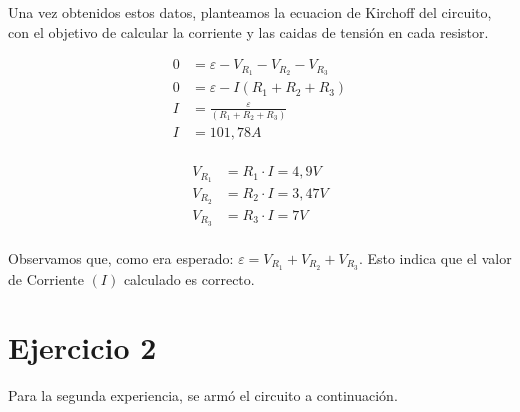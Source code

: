 \documentclass[12pt]{report}
\begin{document}
Una vez obtenidos estos datos, planteamos la ecuacion de Kirchoff del circuito,
con el objetivo de calcular la corriente y las caidas de tensión en cada resistor.

\begin{minipage}[t]{0.48\textwidth}
  $$
  \begin{aligned}
    0 &= \varepsilon - V_{R_1} - V_{R_2} - V_{R_3}\\[6pt]
    0 &= \varepsilon - I (R_1 + R_2 + R_3)\\[6pt]
    I &= \frac{\varepsilon}{(R_1 + R_2 + R_3)}\\[6pt]
    I &= 101,78A\\[6pt]
  \end{aligned}
  $$
\end{minipage}
\hfill
\begin{minipage}[t]{0.48\textwidth}
  \vspace{7mm}
  $$
  \begin{aligned}
    V_{R_1} &= R_1 \cdot I = 4,9 V\\[6pt]
    V_{R_2} &= R_2 \cdot I = 3,47 V\\[6pt]
    V_{R_3} &= R_3 \cdot I = 7 V\\[6pt]
  \end{aligned}
  $$
\end{minipage}

Observamos que, como era esperado: $\varepsilon =  V_{R_1} + V_{R_2} + V_{R_3}$. Esto 
indica que el valor de Corriente $(I)$ calculado es correcto.

%
%
%
%

\chapter{Ejercicio 2}
Para la segunda experiencia, se armó el circuito a continuación.
\end{document}
